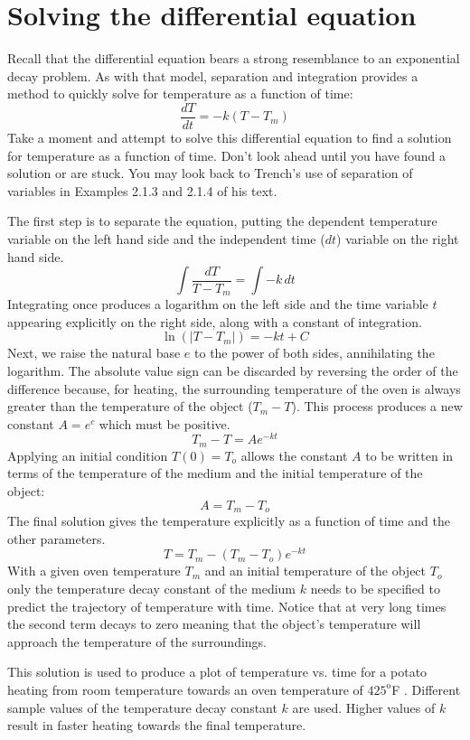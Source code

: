 \documentclass{ximera}
\begin{document}
\section*{Solving the differential equation}
 
Recall that the differential equation bears a strong resemblance to an exponential decay problem.  As with that model, separation and integration provides a method to quickly solve for temperature as a function of time:
\[
\frac{dT}{dt}=-k(T-T_m)
\]
Take a moment and attempt to solve this differential equation to find a solution for temperature as a function of time.  Don't look ahead until you have found a solution or are stuck.  You may look back to Trench's use of separation of variables in Examples 2.1.3 and 2.1.4 of his text.
    
The first step is to separate the equation, putting the dependent temperature variable on the left hand side and the independent time ($dt$) variable on the right hand side.
\[
\int\!\frac{dT}{T-T_m}=\int-k\,dt
\]
Integrating once produces a logarithm on the left side and the time variable $t$ appearing explicitly on the right side, along with a constant of integration.
\[
\ln(|T-T_m |)=-kt+C
\]
Next, we raise the natural base $e$ to the power of both sides, annihilating the logarithm.  The absolute value sign can be discarded by reversing the order of the difference because, for heating, the surrounding temperature of the oven is always greater than the temperature of the object ($T_m-T$).  This process produces a new constant $A=e^c$ which must be positive.
\[
T_m-T=Ae^{-kt}
\]
Applying an initial condition $T(0)=T_o$ allows the constant $A$ to be written in terms of the temperature of the medium and the initial temperature of the object:
\[
A=T_m-T_o
\]
The final solution gives the temperature explicitly as a function of time and the other parameters.
\[
T=T_m-(T_m-T_o ) e^{-kt}
\]
With a given oven temperature $T_m$ and an initial temperature of the object $T_o$ only the temperature decay constant of the medium $k$ needs to be specified to predict the trajectory of temperature with time.  Notice that at very long times the second term decays to zero meaning that the object's temperature will approach the temperature of the surroundings.

This solution is used to produce a plot of temperature vs. time for a potato heating from room temperature towards an oven temperature of $425^{\text{o}}$F .  Different sample values of the temperature decay constant $k$ are used.  Higher values of $k$ result in faster heating towards the final temperature.
\end{document}
